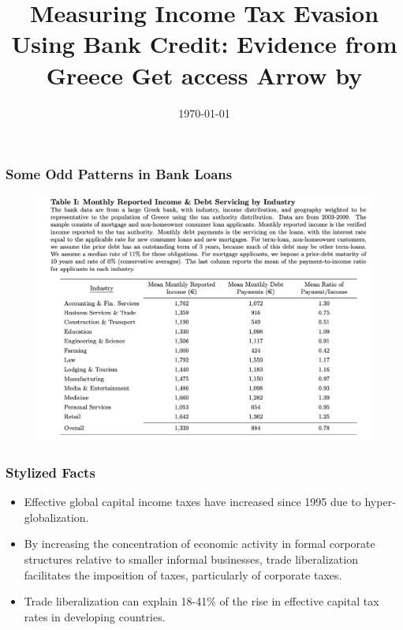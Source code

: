 \documentclass{beamer}
\title{Measuring Income Tax Evasion Using Bank Credit: Evidence from Greece Get access Arrow by \citet{artavanis2016measuring}}
\author{}
\date{\today}
\begin{document}
\frame{\titlepage}

\begin{frame}
\frametitle{Some Odd Patterns in Bank Loans}
\begin{figure}
    \centering
    \includegraphics[width=\textwidth]{Paper Presentations/Table1.png}
\end{figure}
\end{frame}


\begin{frame}
\frametitle{Stylized Facts }
\begin{itemize}
    \item Effective global capital income taxes have increased since 1995 due to hyper-globalization. 
    \item By increasing the concentration
of economic activity in formal corporate structures relative to smaller informal businesses, trade liberalization facilitates the imposition of taxes, particularly of corporate taxes.
\item Trade liberalization can explain 18-41\% of the
rise in effective capital tax rates in developing countries.
\end{itemize}
\end{frame}
\end{document}
